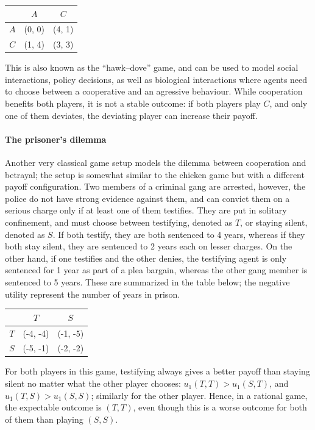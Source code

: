 \documentclass[12pt, showidx, twoside]{article}
\begin{document}
{{{\begin{center}
\begin{tabular}{c|cc|}
 ~  & $A$ & $C$ \\ \hline
$A$ & (0, 0) & (4, 1) \\
$C$ & (1, 4) & (3, 3) \\
\hline
\end{tabular}
\end{center}

This is also known as the ``hawk--dove'' game, and can be used to model social interactions, policy decisions, as well as biological interactions where agents need to choose between a cooperative and an agressive behaviour. While cooperation benefits both players, it is not a stable outcome: if both players play $C$, and only one of them deviates, the deviating player can increase their payoff.

\paragraph{The prisoner's dilemma} Another very classical game setup models the dilemma between cooperation and betrayal; the setup is somewhat similar to the chicken game but with a different payoff configuration. Two members of a criminal gang are arrested, however, the police do not have strong evidence against them, and can convict them on a serious charge only if at least one of them testifies. They are put in solitary confinement, and must choose between testifying, denoted as $T$, or staying silent, denoted as $S$. If both testify, they are both sentenced to 4 years, whereas if they both stay silent, they are sentenced to 2 years each on lesser charges. On the other hand, if one testifies and the other denies, the testifying agent is only sentenced for 1 year as part of a plea bargain, whereas the other gang member is sentenced to 5 years. These are summarized in the table below; the negative utility represent the number of years in prison.

\begin{center}
\begin{tabular}{c|cc|}
 ~  & $T$ & $S$ \\ \hline
$T$ & (-4, -4) & (-1, -5) \\
$S$ & (-5, -1) & (-2, -2) \\
\hline
\end{tabular}
\end{center}

For both players in this game, testifying always gives a better payoff than staying silent no matter what the other player chooses: $u_1(T,T)>u_1(S,T)$, and $u_1(T,S)>u_1(S,S)$; similarly for the other player. Hence, in a rational game, the expectable outcome is $(T,T)$, even though this is a worse outcome for both of them than playing $(S,S)$.

}}}
\end{document}
